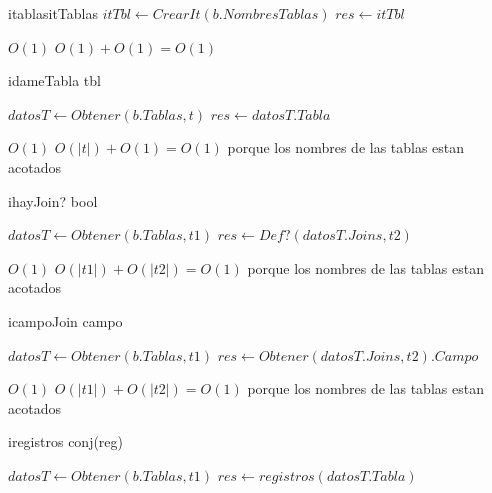 \begin{Algoritmos}
\begin{algoritmo}{itablas}{}{itTablas}
    $itTbl \gets CrearIt(b.NombresTablas)$ 
	$res \gets itTbl$   	    
\end{algoritmo}

\datosAlgoritmo{} %
{} %
{} %
{$O(1)$} %
{$O(1) + O(1) = O(1)$} %

\begin{algoritmo}{idameTabla}{ }{tbl}

	$datosT \gets Obtener(b.Tablas,t)$ 
	$res \gets datosT.Tabla$ 
    
\end{algoritmo}

\datosAlgoritmo{} %
{} %
{} %
{$O(1)$} %
{$O(|t|) + O(1) = O(1)$ porque los nombres de las tablas estan acotados} %

\begin{algoritmo}{ihayJoin?}{  }{bool}

	$datosT \gets Obtener(b.Tablas, t1)$ 
	$res \gets Def?(datosT.Joins, t2)$ 

\end{algoritmo}

\datosAlgoritmo{} %
{} %
{} %
{$O(1)$} %
{$O(|t1|) + O(|t2|) = O(1)$ porque los nombres de las tablas estan acotados} %

\begin{algoritmo}{icampoJoin}{  }{campo}%

	$datosT \gets Obtener(b.Tablas,t1)$ 
    $res \gets Obtener(datosT.Joins, t2).Campo$ 
    
\end{algoritmo}

\datosAlgoritmo{} %
{} %
{} %
{$O(1)$} %
{$O(|t1|) + O(|t2|) = O(1)$ porque los nombres de las tablas estan acotados} %

\begin{algoritmo}{iregistros}{ }{conj(reg)}%

	$datosT \gets Obtener(b.Tablas,t1)$ 
    $res \gets registros(datosT.Tabla)$ 
    

\end{algoritmo}
\end{Algoritmos}
